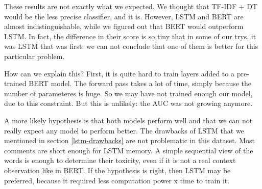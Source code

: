 \documentclass[11pt]{scrartcl}
\begin{document}
These results are not exactly what we expected. We thought that TF-IDF + DT would be the less precise classifier, and it is. However, LSTM and BERT are almost indistinguishable, while we figured out that BERT would outperform LSTM. In fact, the difference in their score is so tiny that in some of our trys, it was LSTM that was first: we can not conclude that one of them is better for this particular problem.

How can we explain this? First, it is quite hard to train layers added to a pre-trained BERT model. The forward pass takes a lot of time, simply because the number of parameteres is huge. So we may have not trained enough our model, due to this constraint. But this is unlikely: the AUC was not growing anymore.

A more likely hypothesis is that both models perform well and that we can not really expect any model to perform better. The drawbacks of LSTM that we mentioned in section \ref{lstm-drawbacks} are not problematic in this dataset. Most comments are short enough for LSTM memory. A simple sequential view of the words is enough to determine their toxicity, even if it is not a real context observation like in BERT. If the hypothesis is right, then LSTM may be preferred, because it required less computation power x time to train it.



\appendix
\end{document}
